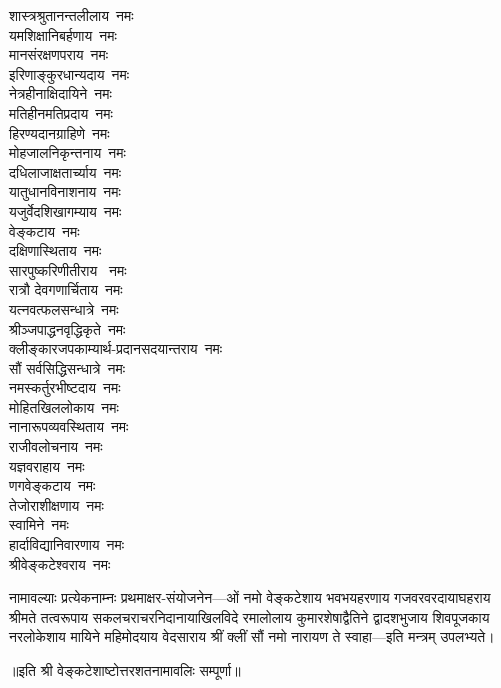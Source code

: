 \begin{multicols}{2}
\begin{flushleft}
शास्त्रश्रुतानन्तलीलाय~नमः\\
यमशिक्षानिबर्हणाय~नमः\\
मानसंरक्षणपराय~नमः\\
इरिणाङ्कुरधान्यदाय~नमः\\
नेत्रहीनाक्षिदायिने~नमः\\
मतिहीनमतिप्रदाय~नमः\\
हिरण्यदानग्राहिणे~नमः\\
मोहजालनिकृन्तनाय~नमः\\
दधिलाजाक्षतार्च्याय~नमः\\
यातुधानविनाशनाय~नमः\hfill{}\\
                                                        
यजुर्वेदशिखागम्याय~नमः\\
वेङ्कटाय~नमः\\
दक्षिणास्थिताय~नमः\\
सारपुष्करिणीतीराय ~नमः\\
रात्रौ  देवगणार्चिताय~नमः\\
यत्नवत्फलसन्धात्रे~नमः\\
श्रीञ्जपाद्धनवृद्धिकृते~नमः\\
क्लीङ्कारजपकाम्यार्थ-प्रदानसदयान्तराय~नमः\\
सौं सर्वसिद्धिसन्धात्रे~नमः\\
नमस्कर्तुरभीष्टदाय~नमः\hfill{}\\
        
मोहितखिललोकाय~नमः\\
नानारूपव्यवस्थिताय~नमः\\
राजीवलोचनाय~नमः\\
यज्ञवराहाय~नमः\\
णगवेङ्कटाय~नमः\\
तेजोराशीक्षणाय~नमः\\
स्वामिने~नमः\\
हार्दाविद्यानिवारणाय~नमः\hfill{}\\
श्रीवेङ्कटेश्वराय~नमः\\
    \end{flushleft}
\end{multicols}

नामावल्याः प्रत्येकनाम्नः प्रथमाक्षर-संयोजनेन---ओं नमो वेङ्कटेशाय
भवभयहरणाय
गजवरवरदायाघहराय
श्रीमते तत्वरूपाय
सकलचराचरनिदानायाखिलविदे
रमालोलाय
कुमारशेषाद्वैतिने
द्वादशभुजाय
शिवपूजकाय
नरलोकेशाय
मायिने
महिमोदयाय
वेदसाराय
श्रीं क्लीं सौं
नमो नारायण ते स्वाहा---इति मन्त्रम् उपलभ्यते।

॥इति श्री वेङ्कटेशाष्टोत्तरशतनामावलिः सम्पूर्णा॥
